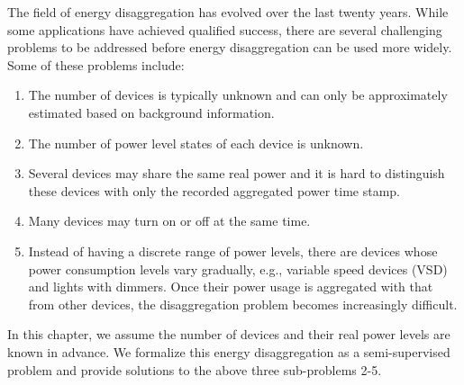 The field of energy disaggregation has evolved
over the last twenty years. While
some applications have achieved
qualified success, there are several challenging
problems to be addressed before energy disaggregation can be
used more widely. Some of these problems include:

\begin{enumerate}
\item The number of devices is typically unknown and can only be
approximately estimated based on background information.

\item The number of power level states of each device is unknown.

\item Several devices may share the same real power and
it is hard to distinguish these devices with only the recorded aggregated
power time stamp.

\item Many devices may turn on or off at the same time.

\item Instead of having a discrete range of power
levels, there are devices whose power consumption levels
   vary gradually, e.g.,
  variable speed devices (VSD) and lights with dimmers.
Once their power usage is aggregated with that from other devices, the
disaggregation problem becomes increasingly difficult.

\end{enumerate}

In this chapter, we assume  the number of devices and their real power 
levels are known in advance. We formalize this energy disaggregation as a semi-supervised problem
and provide solutions to the above three sub-problems 2-5. 


